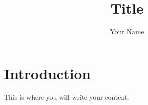 \documentclass{article}
\title{Title}
\author{Your Name}
\begin{document}
\maketitle{}
\section{Introduction}
This is where you will write your content.
\end{document}
